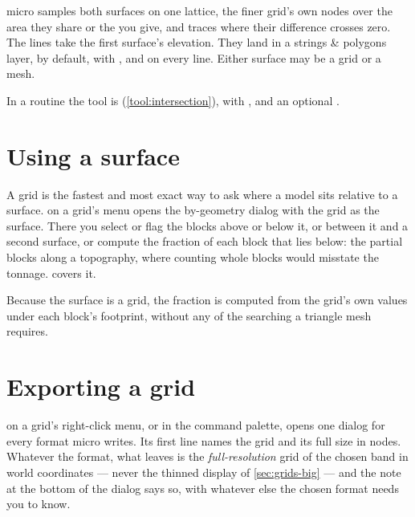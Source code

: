 micro samples both surfaces on one lattice, the finer grid's own nodes over the area they share or the  you give, and traces where their difference crosses zero. The lines take the first surface's elevation. They land in a strings \& polygons layer,  by default, with ,  and  on every line. Either surface may be a grid or a mesh.

In a routine the tool is  (\cref{tool:intersection}), with ,  and an optional .

\section{Using a surface}\label{sec:grids-using}

A grid is the fastest and most exact way to ask where a model sits relative to a surface.  on a grid's menu opens the by-geometry dialog with the grid as the surface. There you select or flag the blocks above or below it, or between it and a second surface, or compute the fraction of each block that lies below: the partial blocks along a topography, where counting whole blocks would misstate the tonnage.  covers it.

Because the surface is a grid, the fraction is computed from the grid's own values under each block's footprint, without any of the searching a triangle mesh requires.

\section{Exporting a grid}\label{sec:grids-export}

 on a grid's right-click menu, or  in the command palette, opens one dialog for every format micro writes. Its first line names the grid and its full size in nodes. Whatever the format, what leaves is the \emph{full-resolution} grid of the chosen band in world coordinates — never the thinned display of \cref{sec:grids-big} — and the note at the bottom of the dialog says so, with whatever else the chosen format needs you to know.

